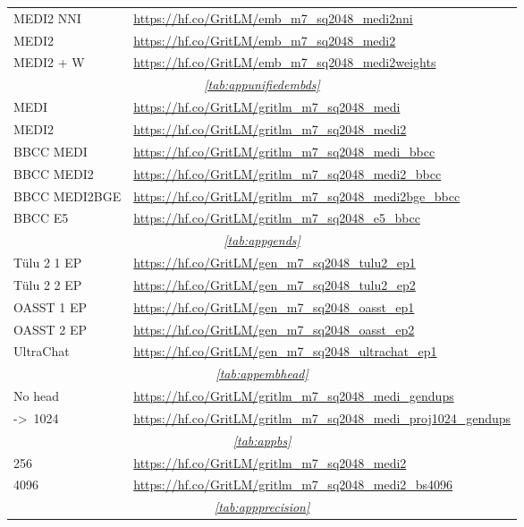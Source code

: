 \documentclass{article}
\newcommand{\tulu}{T\"ulu}
\begin{document}
\begin{longtable}{p{2.9cm} p{10.2cm}}
MEDI2 NNI & \url{https://hf.co/GritLM/emb_m7_sq2048_medi2nni} \\
MEDI2 & \url{https://hf.co/GritLM/emb_m7_sq2048_medi2} \\
MEDI2 + W & \url{https://hf.co/GritLM/emb_m7_sq2048_medi2weights}  \\
\midrule
\multicolumn{2}{c}{\textit{\autoref{tab:appunifiedembds}}} \\
\midrule
MEDI & \url{https://hf.co/GritLM/gritlm_m7_sq2048_medi} \\
MEDI2 & \url{https://hf.co/GritLM/gritlm_m7_sq2048_medi2} \\
BBCC MEDI & \url{https://hf.co/GritLM/gritlm_m7_sq2048_medi_bbcc} \\
BBCC MEDI2 & \url{https://hf.co/GritLM/gritlm_m7_sq2048_medi2_bbcc} \\
BBCC MEDI2BGE & \url{https://hf.co/GritLM/gritlm_m7_sq2048_medi2bge_bbcc} \\
BBCC E5 & \url{https://hf.co/GritLM/gritlm_m7_sq2048_e5_bbcc} \\
\midrule
\multicolumn{2}{c}{\textit{\autoref{tab:appgends}}} \\
\midrule
\tulu{} 2 1 EP & \url{https://hf.co/GritLM/gen_m7_sq2048_tulu2_ep1} \\
\tulu{} 2 2 EP & \url{https://hf.co/GritLM/gen_m7_sq2048_tulu2_ep2} \\
OASST 1 EP & \url{https://hf.co/GritLM/gen_m7_sq2048_oasst_ep1} \\
OASST 2 EP & \url{https://hf.co/GritLM/gen_m7_sq2048_oasst_ep2} \\
UltraChat & \url{https://hf.co/GritLM/gen_m7_sq2048_ultrachat_ep1} \\
\midrule
\multicolumn{2}{c}{\textit{\autoref{tab:appembhead}}} \\
\midrule
No head & \url{https://hf.co/GritLM/gritlm_m7_sq2048_medi_gendups} \\
->~1024 & \url{https://hf.co/GritLM/gritlm_m7_sq2048_medi_proj1024_gendups} \\
\midrule
\multicolumn{2}{c}{\textit{\autoref{tab:appbs}}} \\
\midrule
256 & \url{https://hf.co/GritLM/gritlm_m7_sq2048_medi2} \\
4096 & \url{https://hf.co/GritLM/gritlm_m7_sq2048_medi2_bs4096} \\
\midrule
\multicolumn{2}{c}{\textit{\autoref{tab:appprecision}}} \\

\end{longtable}
\end{document}
